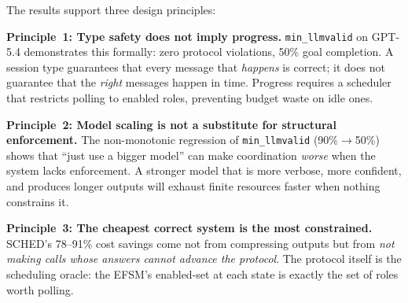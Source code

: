 The results support three design principles:

\textbf{Principle~1: Type safety does not imply progress.}
\texttt{min\_llmvalid} on GPT-5.4 demonstrates this formally:
zero protocol violations, 50\% goal completion.
A session type guarantees that every message that \emph{happens} is
correct; it does not guarantee that the \emph{right} messages happen
in time.
Progress requires a scheduler that restricts polling to enabled roles,
preventing budget waste on idle ones.

\textbf{Principle~2: Model scaling is not a substitute for structural
enforcement.}
The non-monotonic regression of \texttt{min\_llmvalid} (90\%$\to$50\%)
shows that ``just use a bigger model'' can make coordination
\emph{worse} when the system lacks enforcement.
A stronger model that is more verbose, more confident, and produces
longer outputs will exhaust finite resources faster when nothing
constrains it.

\textbf{Principle~3: The cheapest correct system is the most constrained.}
SCHED's 78--91\% cost savings come not from compressing outputs but
from \emph{not making calls whose answers cannot advance the protocol}.
The protocol itself is the scheduling oracle: the EFSM's enabled-set
at each state is exactly the set of roles worth polling.
